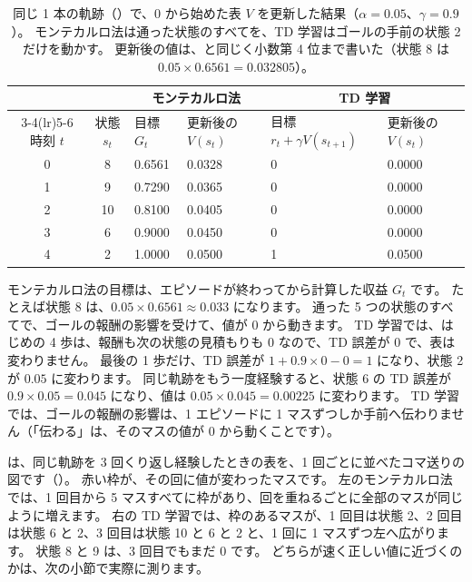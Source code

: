 \begin{table}[tbp]
\centering
\caption{同じ 1 本の軌跡（）で、0 から始めた表 $V$ を更新した結果（$\alpha=0.05$、$\gamma=0.9$）。
モンテカルロ法は通った状態のすべてを、TD 学習はゴールの手前の状態 2 だけを動かす。
更新後の値は、と同じく小数第 4 位まで書いた（状態 8 は $0.05\times0.6561=0.032805$）。}
\label{tab:rlb-mc-td-hand}
\small
\begin{tabular}{ccllll}
\toprule
 & & \multicolumn{2}{c}{モンテカルロ法} & \multicolumn{2}{c}{TD 学習} \\
\cmidrule(lr){3-4}\cmidrule(lr){5-6}
時刻 $t$ & 状態 $s_t$ & 目標 $G_t$ & 更新後の $V(s_t)$ & 目標 $r_t+\gamma V(s_{t+1})$ & 更新後の $V(s_t)$ \\
\midrule
0 & 8 & 0.6561 & 0.0328 & 0 & 0.0000 \\
1 & 9 & 0.7290 & 0.0365 & 0 & 0.0000 \\
2 & 10 & 0.8100 & 0.0405 & 0 & 0.0000 \\
3 & 6 & 0.9000 & 0.0450 & 0 & 0.0000 \\
4 & 2 & 1.0000 & 0.0500 & 1 & 0.0500 \\
\bottomrule
\end{tabular}
\end{table}

モンテカルロ法の目標は、エピソードが終わってから計算した収益 $G_t$ です。
たとえば状態 8 は、$0.05\times0.6561\approx0.033$ になります。
通った 5 つの状態のすべてで、ゴールの報酬の影響を受けて、値が 0 から動きます。
TD 学習では、はじめの 4 歩は、報酬も次の状態の見積もりも 0 なので、TD 誤差が 0 で、表は変わりません。
最後の 1 歩だけ、TD 誤差が $1+0.9\times0-0=1$ になり、状態 2 が $0.05$ に変わります。
同じ軌跡をもう一度経験すると、状態 6 の TD 誤差が $0.9\times0.05=0.045$ になり、値は $0.05\times0.045=0.00225$ に変わります。
TD 学習では、ゴールの報酬の影響は、1 エピソードに 1 マスずつしか手前へ伝わりません（「伝わる」は、そのマスの値が 0 から動くことです）。

は、同じ軌跡を 3 回くり返し経験したときの表を、1 回ごとに並べたコマ送りの図です（）。
赤い枠が、その回に値が変わったマスです。
左のモンテカルロ法では、1 回目から 5 マスすべてに枠があり、回を重ねるごとに全部のマスが同じように増えます。
右の TD 学習では、枠のあるマスが、1 回目は状態 2、2 回目は状態 6 と 2、3 回目は状態 10 と 6 と 2 と、1 回に 1 マスずつ左へ広がります。
状態 8 と 9 は、3 回目でもまだ 0 です。
どちらが速く正しい値に近づくのかは、次の小節で実際に測ります。

